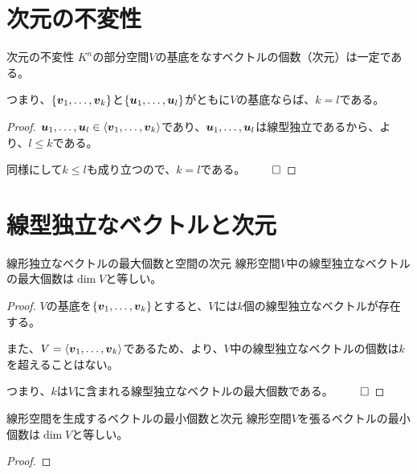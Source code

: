 \documentclass[../../../topic_linear-algebra]{subfiles}
\begin{document}
\sectionline
\section{次元の不変性}

\begin{theorem*}{次元の不変性}
  $K^n$の部分空間$V$の基底をなすベクトルの個数（次元）は一定である。

  つまり、$\{ \vb*{v}_1, \dots, \vb*{v}_k \}$と$\{ \vb*{u}_1, \dots, \vb*{u}_l \}$がともに$V$の基底ならば、$k = l$である。
\end{theorem*}

\begin{proof}
  $\vb*{u}_1, \dots, \vb*{u}_l \in \langle \vb*{v}_1, \dots, \vb*{v}_k \rangle$であり、$\vb*{u}_1, \dots, \vb*{u}_l$は線型独立であるから、より、$l \leq k$である。

  同様にして$k \leq l$も成り立つので、$k = l$である。 $\qed$
\end{proof}

\sectionline
\section{線型独立なベクトルと次元}

\begin{theorem*}{線形独立なベクトルの最大個数と空間の次元}
  線形空間$V$中の線型独立なベクトルの最大個数は$\dim V$と等しい。
\end{theorem*}

\begin{proof}
  $V$の基底を$\{ \vb*{v}_1,\dots, \vb*{v}_k \}$とすると、$V$には$k$個の線型独立なベクトルが存在する。

  また、$V = \langle \vb*{v}_1, \dots, \vb*{v}_k \rangle$であるため、より、$V$中の線型独立なベクトルの個数は$k$を超えることはない。

  つまり、$k$は$V$に含まれる線型独立なベクトルの最大個数である。 $\qed$
\end{proof}

\sectionline

\begin{theorem*}{線形空間を生成するベクトルの最小個数と次元}
  線形空間$V$を張るベクトルの最小個数は$\dim V$と等しい。
\end{theorem*}

\begin{proof}
\end{proof}
\end{document}
